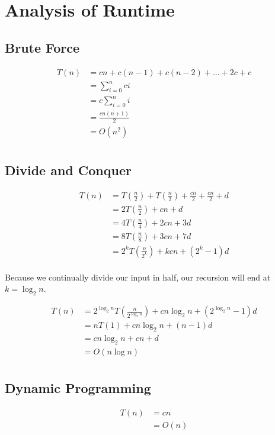 \documentclass[12pt,letterpaper]{article}
\begin{document}
\section{Analysis of Runtime}
\subsection{Brute Force}
\begin{align*}
  T(n) &= cn + c(n-1) + c(n-2) + ... + 2c + c \\
       &= \sum_{i=0}^{n} ci \\
       &= c \sum_{i=0}^{n} i \\
       &= \frac{cn(n+1)}{2} \\
       &= O(n^2) \\
\end{align*}

\subsection{Divide and Conquer}
\begin{align*}
  T(n) &= T(\frac{n}{2}) + T(\frac{n}{2}) + \frac{cn}{2} + \frac{cn}{2} + d \\
       &= 2T(\frac{n}{2}) + cn + d \\
       &= 4T(\frac{n}{4}) + 2cn + 3d \\
       &= 8T(\frac{n}{8}) + 3cn + 7d \\
       &= 2^k T(\frac{n}{2^k}) + kcn + (2^k - 1)d \\
\end{align*}

Because we continually divide our input in half, our recursion will end at $k =
\log_2 n$.

\begin{align*}
  T(n) &= 2^{\log_2 n}T(\frac{n}{2^{\log_2 n}}) + cn\log_2 n + (2^{\log_2 n} - 1)d \\
       &= nT(1) + cn\log_2 n + (n - 1)d \\
       &= cn\log_2 n + cn + d \\
       &= O(n\log n) \\
\end{align*}

\subsection{Dynamic Programming}

\begin{align*}
  T(n) &= cn \\
       &= O(n) \\
\end{align*}
\end{document}

